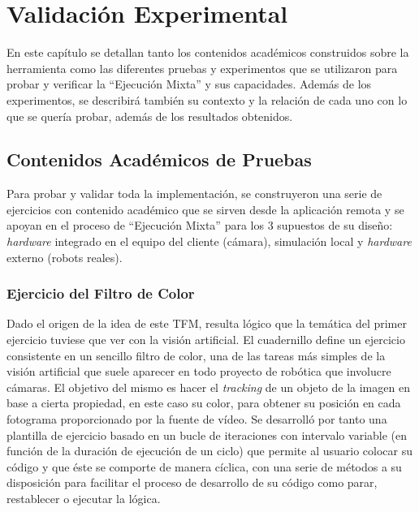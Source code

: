 \chapter{ Validación Experimental}

En este capítulo se detallan tanto los contenidos académicos construidos sobre la herramienta como las diferentes pruebas y experimentos que se utilizaron para probar y verificar la ``Ejecución Mixta'' y sus capacidades. Además de los experimentos, se describirá también su contexto y la relación de cada uno con lo que se quería probar, además de los resultados obtenidos.

\section{Contenidos Académicos de Pruebas}

Para probar y validar toda la implementación, se construyeron una serie de ejercicios con contenido académico que se sirven desde la aplicación remota y se apoyan en el proceso de ``Ejecución Mixta'' para los 3 supuestos de su diseño: \textit{hardware} integrado en el equipo del cliente (cámara), simulación local y \textit{hardware} externo (robots reales).

\subsection{Ejercicio del Filtro de Color}

Dado el origen de la idea de este TFM, resulta lógico que la temática del primer ejercicio tuviese que ver con la visión artificial. El cuadernillo define un ejercicio consistente en un sencillo filtro de color, una de las tareas más simples de la visión artificial que suele aparecer en todo proyecto de robótica que involucre cámaras. El objetivo del mismo es hacer el \textit{tracking} de un objeto de la imagen en base a cierta propiedad, en este caso su color, para obtener su posición en cada fotograma proporcionado por la fuente de vídeo. Se desarrolló por tanto una plantilla de ejercicio basado en un bucle de iteraciones con intervalo variable (en función de la duración de ejecución de un ciclo) que permite al usuario colocar su código y que éste se comporte de manera cíclica, con una serie de métodos a su disposición para facilitar el proceso de desarrollo de su código como parar, restablecer o ejecutar la lógica.

